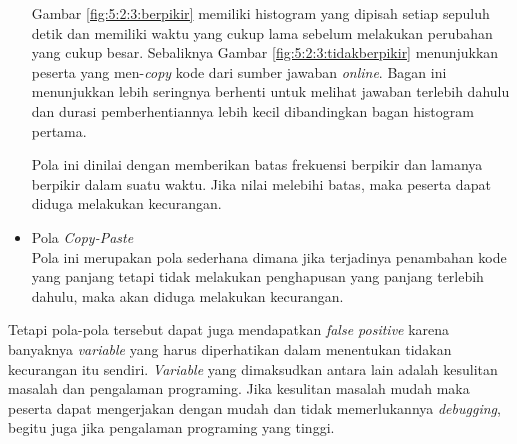 \begin{itemize}
    Gambar \ref{fig:5:2:3:berpikir} memiliki histogram yang dipisah setiap sepuluh detik dan memiliki waktu yang cukup lama sebelum melakukan perubahan yang cukup besar. Sebaliknya Gambar \ref{fig:5:2:3:tidakberpikir} menunjukkan peserta yang men-\textit{copy} kode dari sumber jawaban \textit{online}. Bagan ini menunjukkan lebih seringnya berhenti untuk melihat jawaban terlebih dahulu dan durasi pemberhentiannya lebih kecil dibandingkan bagan histogram pertama.

    Pola ini dinilai dengan memberikan batas frekuensi berpikir dan lamanya berpikir dalam suatu waktu. Jika nilai melebihi batas, maka peserta dapat diduga melakukan kecurangan.
    
    \item Pola \textit{Copy-Paste} \\
    Pola ini merupakan pola sederhana dimana jika terjadinya penambahan kode yang panjang tetapi tidak melakukan penghapusan yang panjang terlebih dahulu, maka akan diduga melakukan kecurangan.

\end{itemize}

Tetapi pola-pola tersebut dapat juga mendapatkan \textit{false positive} karena banyaknya \textit{variable} yang harus diperhatikan dalam menentukan tidakan kecurangan itu sendiri. \textit{Variable} yang dimaksudkan antara lain adalah kesulitan masalah dan pengalaman programing. Jika kesulitan masalah mudah maka peserta dapat mengerjakan dengan mudah dan tidak memerlukannya \textit{debugging}, begitu juga jika pengalaman programing yang tinggi.